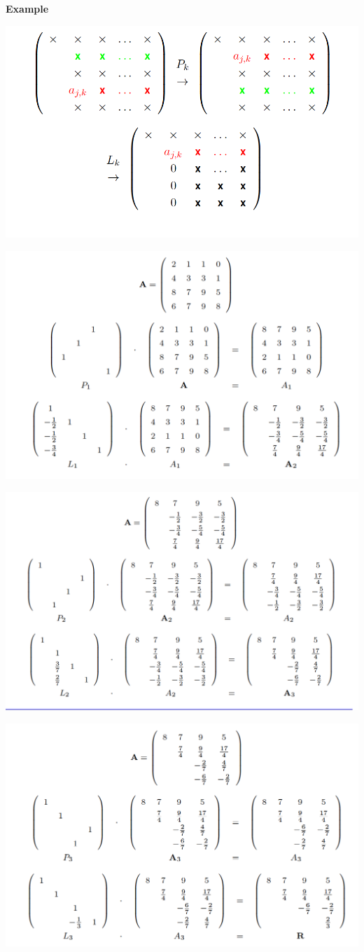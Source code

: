 \textbf{Example}

\includegraphics[width=0.7 \textwidth]{sections/images/lup1.png}

\includegraphics[width=0.8 \textwidth]{sections/images/lup2.png}

\includegraphics[width=0.8 \textwidth]{sections/images/lup3.png}

\includegraphics[width=0.8 \textwidth]{sections/images/lup4.png}


